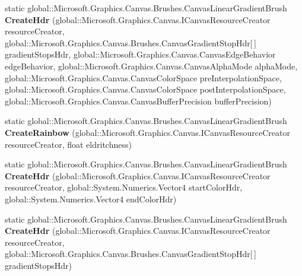 \begin{DoxyCompactItemize}
\item 
\mbox{\label{class_microsoft_1_1_graphics_1_1_canvas_1_1_brushes_1_1_canvas_linear_gradient_brush_a0c6d262a63d8d21f04c1bb8c01fb6ac4}} 
static global\+::\+Microsoft.\+Graphics.\+Canvas.\+Brushes.\+Canvas\+Linear\+Gradient\+Brush {\bfseries Create\+Hdr} (global\+::\+Microsoft.\+Graphics.\+Canvas.\+I\+Canvas\+Resource\+Creator resource\+Creator, global\+::\+Microsoft.\+Graphics.\+Canvas.\+Brushes.\+Canvas\+Gradient\+Stop\+Hdr\mbox{[}$\,$\mbox{]} gradient\+Stops\+Hdr, global\+::\+Microsoft.\+Graphics.\+Canvas.\+Canvas\+Edge\+Behavior edge\+Behavior, global\+::\+Microsoft.\+Graphics.\+Canvas.\+Canvas\+Alpha\+Mode alpha\+Mode, global\+::\+Microsoft.\+Graphics.\+Canvas.\+Canvas\+Color\+Space pre\+Interpolation\+Space, global\+::\+Microsoft.\+Graphics.\+Canvas.\+Canvas\+Color\+Space post\+Interpolation\+Space, global\+::\+Microsoft.\+Graphics.\+Canvas.\+Canvas\+Buffer\+Precision buffer\+Precision)
\item 
\mbox{\label{class_microsoft_1_1_graphics_1_1_canvas_1_1_brushes_1_1_canvas_linear_gradient_brush_a521b2a32aa6e7539839397dae253b7a8}} 
static global\+::\+Microsoft.\+Graphics.\+Canvas.\+Brushes.\+Canvas\+Linear\+Gradient\+Brush {\bfseries Create\+Rainbow} (global\+::\+Microsoft.\+Graphics.\+Canvas.\+I\+Canvas\+Resource\+Creator resource\+Creator, float eldritchness)
\item 
\mbox{\label{class_microsoft_1_1_graphics_1_1_canvas_1_1_brushes_1_1_canvas_linear_gradient_brush_a1164597be8c9b0ac875ac18fdb1f8965}} 
static global\+::\+Microsoft.\+Graphics.\+Canvas.\+Brushes.\+Canvas\+Linear\+Gradient\+Brush {\bfseries Create\+Hdr} (global\+::\+Microsoft.\+Graphics.\+Canvas.\+I\+Canvas\+Resource\+Creator resource\+Creator, global\+::\+System.\+Numerics.\+Vector4 start\+Color\+Hdr, global\+::\+System.\+Numerics.\+Vector4 end\+Color\+Hdr)
\item 
\mbox{\label{class_microsoft_1_1_graphics_1_1_canvas_1_1_brushes_1_1_canvas_linear_gradient_brush_a5aac477d60f1a54fac610c89d85f7c46}} 
static global\+::\+Microsoft.\+Graphics.\+Canvas.\+Brushes.\+Canvas\+Linear\+Gradient\+Brush {\bfseries Create\+Hdr} (global\+::\+Microsoft.\+Graphics.\+Canvas.\+I\+Canvas\+Resource\+Creator resource\+Creator, global\+::\+Microsoft.\+Graphics.\+Canvas.\+Brushes.\+Canvas\+Gradient\+Stop\+Hdr\mbox{[}$\,$\mbox{]} gradient\+Stops\+Hdr)

\end{DoxyCompactItemize}

